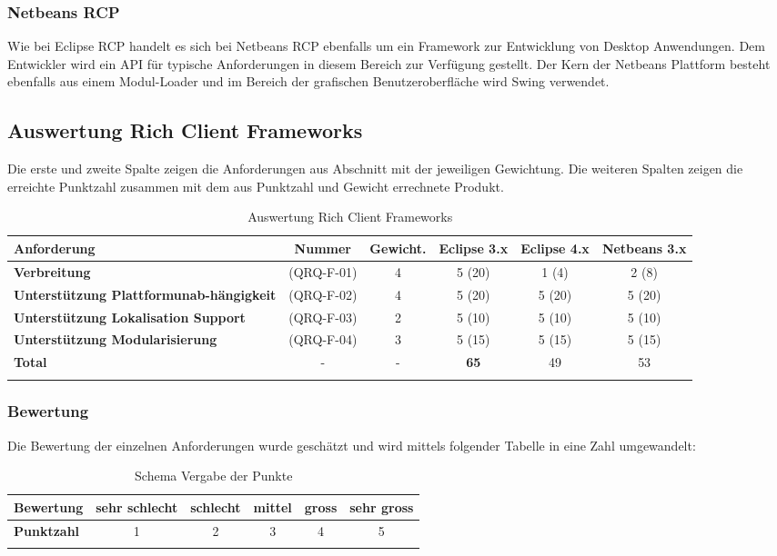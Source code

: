 \subsubsection{Netbeans RCP}
Wie bei Eclipse RCP handelt es sich bei Netbeans RCP ebenfalls um ein Framework zur Entwicklung von Desktop Anwendungen. Dem Entwickler wird ein API für typische Anforderungen in diesem Bereich zur Verfügung gestellt. Der Kern der Netbeans Plattform besteht ebenfalls aus einem Modul-Loader und im Bereich der grafischen Benutzeroberfläche wird Swing verwendet.

\subsection{Auswertung Rich Client Frameworks}
Die erste und zweite Spalte zeigen die Anforderungen aus Abschnitt  mit der jeweiligen Gewichtung. Die weiteren Spalten zeigen die erreichte Punktzahl zusammen mit dem aus Punktzahl und Gewicht errechnete Produkt.
\begin{longtable}{|p{3cm}|c|c|c|c|c|}\hline
 \textbf{Anforderung} & \textbf{Nummer} &  \textbf{Gewicht.} & \textbf{Eclipse 3.x} & \textbf{Eclipse 4.x} &  \textbf{Netbeans 3.x}\\\hline
   \textbf{Verbreitung} & (QRQ-F-01) & 4 & 5 (20) & 1 (4) & 2 (8)\\\hline
   \textbf{Unterstützung Plattformunab-hängigkeit} & (QRQ-F-02) & 4 & 5 (20) & 5 (20) & 5 (20)\\\hline
   \textbf{Unterstützung Lokalisation Support} & (QRQ-F-03) & 2 & 5 (10) & 5 (10) & 5 (10) \\\hline
   \textbf{Unterstützung Modularisierung} & (QRQ-F-04) & 3 & 5 (15) & 5 (15) & 5 (15) \\\hline
   \textbf{Total} & - & - & \textbf{65} & 49 & 53\\\hline
    \caption{Auswertung Rich Client Frameworks}
\end{longtable}

\subsubsection{Bewertung}
Die Bewertung der einzelnen Anforderungen wurde geschätzt und wird mittels folgender Tabelle in eine Zahl umgewandelt:
\begin{longtable}{|l|c|c|c|c|c|}\hline
 \textbf{Bewertung} & sehr schlecht & schlecht & mittel & gross & sehr gross\\\hline
 \textbf{Punktzahl} & 1 & 2 & 3 & 4 & 5\\\hline
 \caption{Schema Vergabe der Punkte}
\end{longtable}

